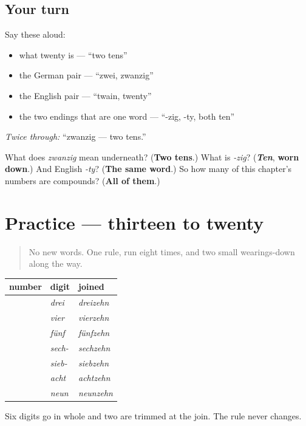 \subsection*{Your turn}
Say these aloud:

\begin{itemize}
\raggedright
  \item what twenty is — \textquotedblleft{}two tens\textquotedblright{}
  \item the German pair — \textquotedblleft{}zwei, zwanzig\textquotedblright{}
  \item the English pair — \textquotedblleft{}twain, twenty\textquotedblright{}
  \item the two endings that are one word — \textquotedblleft{}-zig, -ty, both ten\textquotedblright{}
\end{itemize}

\emph{Twice through:} \textquotedblleft{}zwanzig — two tens.\textquotedblright{}

\begin{tcolorbox}[breakable,colback=teal!4,colframe=teal!35!black,title={Before you move on}]
What does \emph{zwanzig} mean underneath? (\textbf{Two tens}.) What is \emph{-zig}? (\emph{\textbf{Ten}}, \textbf{worn down}.) And English \emph{-ty}? (\textbf{The same word}.) So how many of this chapter's numbers are compounds? (\textbf{All of them}.)
\end{tcolorbox}
\section[Practice]{Practice — thirteen to twenty}

\label{lesson:GE-C12-zahlen-13-20}



\begin{quote}
No new words. One rule, run eight times, and two small wearings-down along the way.
\end{quote}

\begin{grammarlens}[title={Grammar Lens: the rule and its two exceptions that are not exceptions}]
\noindent
\begin{tabularx}{\linewidth}{@{}>{\raggedright\arraybackslash}X>{\raggedright\arraybackslash}X>{\raggedright\arraybackslash}X@{}}
\toprule
\textbf{number} & \textbf{digit} & \textbf{joined} \\
\midrule
13 & \emph{drei} & \emph{dreizehn} \\
14 & \emph{vier} & \emph{vierzehn} \\
15 & \emph{fünf} & \emph{fünfzehn} \\
16 & \emph{sech-} & \emph{sechzehn} \\
17 & \emph{sieb-} & \emph{siebzehn} \\
18 & \emph{acht} & \emph{achtzehn} \\
19 & \emph{neun} & \emph{neunzehn} \\
\bottomrule
\end{tabularx}

Six digits go in whole and two are trimmed at the join. The rule never changes.
\end{grammarlens}

